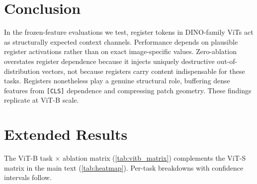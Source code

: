 \documentclass[10pt,twocolumn,letterpaper]{article}
\begin{document}
\section{Conclusion}
\label{sec:conclusion}

In the frozen-feature evaluations we test, register tokens in DINO-family ViTs act as structurally expected context channels. Performance depends on plausible register activations rather than on exact image-specific values.
Zero-ablation overstates register dependence because it injects uniquely destructive out-of-distribution vectors, not because registers carry content indispensable for these tasks.
Registers nonetheless play a genuine structural role, buffering dense features from \texttt{[CLS]} dependence and compressing patch geometry.
These findings replicate at ViT-B scale.

{
    \small
    
    
}

\clearpage
\maketitlesupplementary


\renewcommand{\topfraction}{0.9}
\renewcommand{\bottomfraction}{0.9}
\renewcommand{\textfraction}{0.05}
\renewcommand{\floatpagefraction}{0.85}
\renewcommand{\dbltopfraction}{0.9}
\setcounter{topnumber}{4}
\setcounter{bottomnumber}{4}
\setcounter{totalnumber}{8}
\setcounter{dbltopnumber}{4}

\section{Extended Results}
\label{sec:supp_results}

The ViT-B task $\times$ ablation matrix (\cref{tab:vitb_matrix}) complements the ViT-S matrix in the main text (\cref{tab:heatmap}). Per-task breakdowns with confidence intervals follow.
\end{document}
